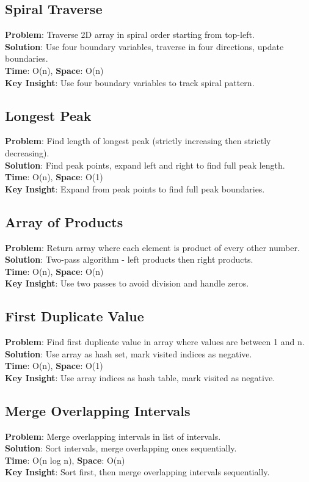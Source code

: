 \documentclass{report}
\begin{document}
\subsection{Spiral Traverse}
\textbf{Problem}: Traverse 2D array in spiral order starting from top-left.\\
\textbf{Solution}: Use four boundary variables, traverse in four directions, update boundaries.\\
\textbf{Time}: O(n), \textbf{Space}: O(n)\\
\textbf{Key Insight}: Use four boundary variables to track spiral pattern.

\subsection{Longest Peak}
\textbf{Problem}: Find length of longest peak (strictly increasing then strictly decreasing).\\
\textbf{Solution}: Find peak points, expand left and right to find full peak length.\\
\textbf{Time}: O(n), \textbf{Space}: O(1)\\
\textbf{Key Insight}: Expand from peak points to find full peak boundaries.

\subsection{Array of Products}
\textbf{Problem}: Return array where each element is product of every other number.\\
\textbf{Solution}: Two-pass algorithm - left products then right products.\\
\textbf{Time}: O(n), \textbf{Space}: O(n)\\
\textbf{Key Insight}: Use two passes to avoid division and handle zeros.

\subsection{First Duplicate Value}
\textbf{Problem}: Find first duplicate value in array where values are between 1 and n.\\
\textbf{Solution}: Use array as hash set, mark visited indices as negative.\\
\textbf{Time}: O(n), \textbf{Space}: O(1)\\
\textbf{Key Insight}: Use array indices as hash table, mark visited as negative.

\subsection{Merge Overlapping Intervals}
\textbf{Problem}: Merge overlapping intervals in list of intervals.\\
\textbf{Solution}: Sort intervals, merge overlapping ones sequentially.\\
\textbf{Time}: O(n log n), \textbf{Space}: O(n)\\
\textbf{Key Insight}: Sort first, then merge overlapping intervals sequentially.
\end{document}
